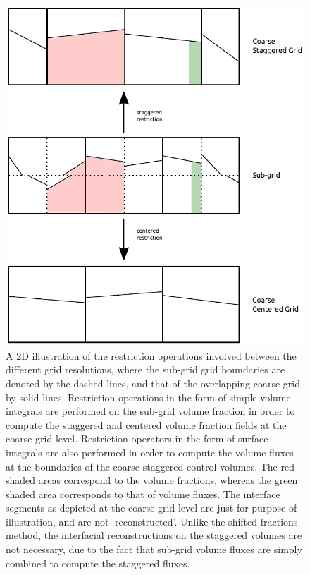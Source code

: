 \begin{figure}[h!]
\centering
\includegraphics[width = \textwidth]{plots/subgrid_restriction.pdf}
\caption{A 2D illustration of the restriction operations involved
	between the different grid resolutions, where the sub-grid 
	grid boundaries are denoted by the dashed lines, 
	and that of the overlapping coarse grid by solid lines. 
	Restriction operations in the form of simple volume integrals
	are performed on the sub-grid volume fraction in order
	to compute the staggered and centered volume fraction 
	fields at the coarse grid level. 
	Restriction operators in the form of surface integrals 
	are also performed in order to compute the volume fluxes
	at the boundaries of the coarse staggered control volumes.
	The red shaded areas correspond to the volume fractions, 
	whereas the green shaded area corresponds to that of volume fluxes.
        The interface segments as depicted at the coarse grid level 
	are just for purpose of illustration, and are not
	`reconstructed'. Unlike the shifted fractions method, the 
	interfacial reconstructions on the staggered volumes are not 
	necessary, due to the fact that sub-grid volume fluxes are 
	simply combined to compute the staggered fluxes.  
	}
\label{restrict}
\end{figure}


